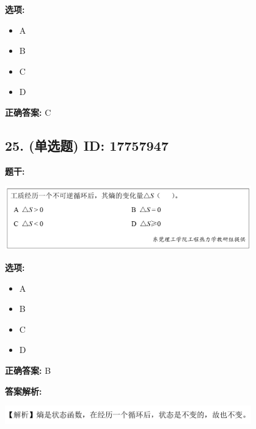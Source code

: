 \documentclass[12pt]{article}
\begin{document}
\textbf{选项:}
\begin{itemize}[leftmargin=*]
  \item A

  \item B

  \item C

  \item D

\end{itemize}

\textbf{正确答案:}
C

\vspace{0.5em}\hrulefill\vspace{1em}

\subsection*{25. (单选题) \small ID: 17757947}

\textbf{题干:}


\begin{center}\includegraphics[width=0.8\textwidth, height=0.25\textheight, keepaspectratio]{question_25_17757947/title_img_1.png}\end{center}

\textbf{选项:}
\begin{itemize}[leftmargin=*]
  \item A

  \item B

  \item C

  \item D

\end{itemize}

\textbf{正确答案:}
B

\textbf{答案解析:}


\begin{center}\includegraphics[width=0.8\textwidth, height=0.25\textheight, keepaspectratio]{question_25_17757947/correct_replay_img_1.png}\end{center}
\end{document}
